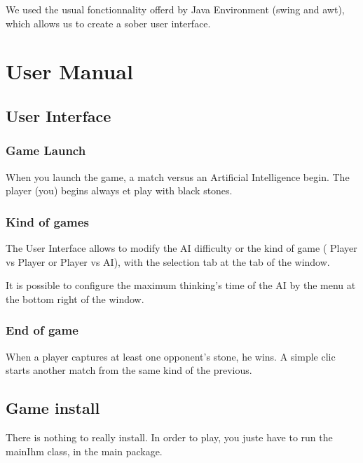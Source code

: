 \documentclass[12pt,a4paper,utf8x]{report}
\begin{document}
\begin{onehalfspace}
		We used the usual fonctionnality offerd by Java Environment (swing and awt), which allows us to create a sober user interface.

	
\clearpage


\chapter{User Manual}

\section{User Interface}

	\subsection{Game Launch}
		When you launch the game, a match versus an Artificial Intelligence begin. The player (you) begins always et play with black stones.
		
	\subsection{Kind of games}

		The User Interface allows to modify the AI difficulty or the kind of game ( Player vs Player or Player vs AI), with the selection tab at the tab of the window.

		It is possible to configure the maximum thinking's time of the AI by the menu at the bottom right of the window.
	
	\subsection{End of game}
		When a player captures at least one opponent's stone, he wins. A simple clic starts another match from the same kind of the previous.
		
\section{Game install}
	
	There is nothing to really install. In order to play, you juste have to run the mainIhm class, in the main package.
	
	
\clearpage




\end{onehalfspace}

%
%
%

\printindex

\appendix
\end{document}
